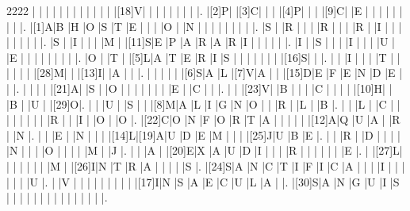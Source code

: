 \documentclass[12pt]{article}
\begin{document}
\begin{Puzzle}{22}{22}
  |{}  |{}  |{}  |{}  |{}  |{}  |{}  |{}  |{}  |{}  |{}  |{}  |[18]V|{}  |{}  |{}  |{}  |{}  |{}  |{}  |{}  |.
  |[2]P|{}  |[3]C|{}  |{}  |{}  |[4]P|{}  |{}  |{}  |[9]C|{}  |E   |{}  |{}  |{}  |{}  |{}  |{}  |{}  |{}  |.
  |[1]A|B   |H   |O   |S   |T   |E   |{}  |{}  |{}  |O   |{}  |N   |{}  |{}  |{}  |{}  |{}  |{}  |{}  |{}  |.
  |S   |{}  |R   |{}  |{}  |{}  |R   |{}  |{}  |{}  |R   |{}  |I   |{}  |{}  |{}  |{}  |{}  |{}  |{}  |{}  |.
  |S   |{}  |I   |{}  |{}  |{}  |M   |{}  |[11]S|E   |P   |A   |R   |A   |R   |I   |{}  |{}  |{}  |{}  |{}  |.
  |I   |{}  |S   |{}  |{}  |{}  |I   |{}  |{}  |{}  |U   |{}  |E   |{}  |{}  |{}  |{}  |{}  |{}  |{}  |{}  |.
  |O   |{}  |T   |{}  |[5]L|A   |T   |E   |R   |I   |S   |{}  |{}  |{}  |{}  |{}  |{}  |{}  |[16]S|{}  |{}  |.
  |{}  |{}  |I   |{}  |{}  |{}  |T   |{}  |{}  |{}  |{}  |{}  |{}  |[28]M|{}  |{}  |[13]I|{}  |A   |{}  |{}  |.
  |{}  |{}  |{}  |{}  |{}  |[6]S|A   |L   |[7]V|A   |{}  |{}  |[15]D|E   |F   |E   |N   |D   |E   |{}  |{}  |.
  |{}  |{}  |{}  |{}  |[21]A|{}  |S   |{}  |O   |{}  |{}  |{}  |{}  |{}  |{}  |{}  |E   |{}  |C   |{}  |{}  |.
  |{}  |{}  |[23]V|{}  |B   |{}  |{}  |{}  |C   |{}  |{}  |{}  |{}  |[10]H|{}  |{}  |B   |{}  |U   |{}  |[29]O|.
  |{}  |{}  |U   |{}  |S   |{}  |{}  |[8]M|A   |L   |I   |G   |N   |O   |{}  |{}  |R   |{}  |L   |{}  |B   |.
  |{}  |{}  |L   |{}  |C   |{}  |{}  |{}  |{}  |{}  |{}  |{}  |{}  |R   |{}  |{}  |I   |{}  |O   |{}  |O   |.
  |[22]C|O   |N   |F   |O   |R   |T   |A   |{}  |{}  |{}  |{}  |{}  |[12]A|Q   |U   |A   |{}  |R   |{}  |N   |.
  |{}  |{}  |E   |{}  |N   |{}  |{}  |{}  |[14]L|[19]A|U   |D   |E   |M   |{}  |{}  |{}  |[25]J|U   |B   |E   |.
  |{}  |{}  |R   |{}  |D   |{}  |{}  |{}  |{}  |N   |{}  |{}  |{}  |O   |{}  |{}  |{}  |{}  |M   |{}  |J   |.
  |{}  |{}  |A   |{}  |[20]E|X   |A   |U   |D   |I   |{}  |{}  |{}  |R   |{}  |{}  |{}  |{}  |{}  |{}  |E   |.
  |{}  |[27]L|{}  |{}  |{}  |{}  |{}  |{}  |{}  |M   |{}  |[26]I|N   |T   |R   |A   |{}  |{}  |{}  |{}  |S   |.
  |[24]S|A   |N   |C   |T   |I   |F   |I   |C   |A   |{}  |{}  |{}  |I   |{}  |{}  |{}  |{}  |{}  |{}  |U   |.
  |{}  |V   |{}  |{}  |{}  |{}  |{}  |{}  |{}  |{}  |{}  |[17]I|N   |S   |A   |E   |C   |U   |L   |A   |{}  |.
  |[30]S|A   |N   |G   |U   |I   |S   |{}  |{}  |{}  |{}  |{}  |{}  |{}  |{}  |{}  |{}  |{}  |{}  |{}  |{}  |.
\end{Puzzle}
\end{document}
